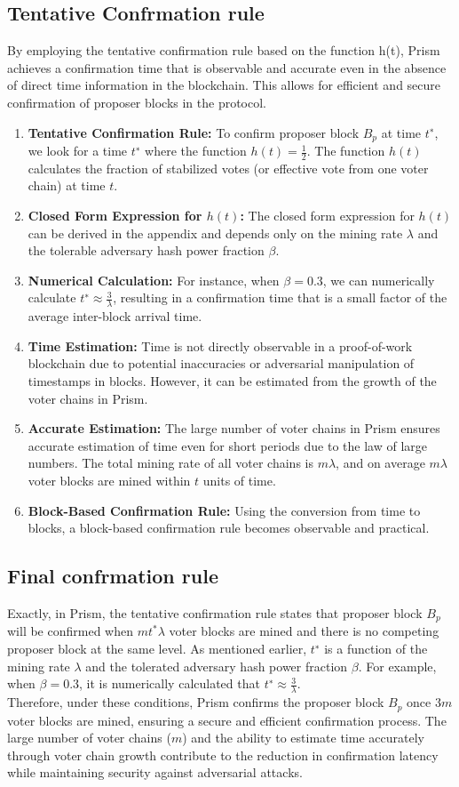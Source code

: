 \subsection{Tentative Confrmation rule}
By employing the tentative confirmation rule based on the function h(t), Prism achieves a confirmation time that is observable and accurate even in the absence of direct time information in the blockchain. This allows for efficient and secure confirmation of proposer blocks in the protocol.\\
\begin{enumerate}
	\item \textbf{Tentative Confirmation Rule:}  To confirm proposer block $B_{p}$ at time $t^{∗}$, we look for a time $t^{∗}$ where the function $h(t) = \frac{1}{2}$. The function $h(t)$ calculates the fraction of stabilized votes (or effective vote from one voter chain) at time $t$.
	\item \textbf{Closed Form Expression for $h(t)$:} The closed form expression for $h(t)$ can be derived in the appendix and depends only on the mining rate $\lambda$ and the tolerable adversary hash power fraction $\beta$.
	\item \textbf{Numerical Calculation:} For instance, when $\beta = 0.3$, we can numerically calculate $t^{∗} ≈ \frac{3}{\lambda}$, resulting in a confirmation time that is a small factor of the average inter-block arrival time.
	\item \textbf{Time Estimation:} Time is not directly observable in a proof-of-work blockchain due to potential inaccuracies or adversarial manipulation of timestamps in blocks. However, it can be estimated from the growth of the voter chains in Prism.
	\item \textbf{Accurate Estimation:} The large number of voter chains in Prism ensures accurate estimation of time even for short periods due to the law of large numbers. The total mining rate of all voter chains is $m\lambda$, and on average $m\lambda$ voter blocks are mined within $t$ units of time.
	\item \textbf{Block-Based Confirmation Rule:} Using the conversion from time to blocks, a block-based confirmation rule becomes observable and practical.
\end{enumerate}
\subsection{Final confrmation rule}
Exactly, in Prism, the tentative confirmation rule states that proposer block $B_{p}$ will be confirmed when $mt^{*}\lambda$ voter blocks are mined and there is no competing proposer block at the same level. As mentioned earlier, $t^{∗}$ is a function of the mining rate $\lambda$ and the tolerated adversary hash power fraction $\beta$. For example, when $\beta = 0.3$, it is numerically calculated that $t^{∗} ≈ \frac{3}{\lambda}$.\\
Therefore, under these conditions, Prism confirms the proposer block $B_{p}$ once $3m$ voter blocks are mined, ensuring a secure and efficient confirmation process. The large number of voter chains ($m$) and the ability to estimate time accurately through voter chain growth contribute to the reduction in confirmation latency while maintaining security against adversarial attacks.
